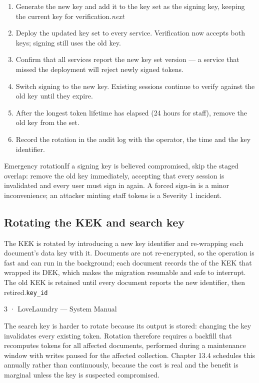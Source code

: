 \documentclass[11pt,a4paper,oneside]{book}
\begin{document}
\begin{enumerate}
\item Generate the new key and add it to the key set as the  signing key, keeping the current key for verification.\emph{next}
\item Deploy the updated key set to every service. Verification now accepts both keys; signing still uses the old key.
\item Confirm that all services report the new key set version — a service that missed the deployment will reject newly signed tokens.
\item Switch signing to the new key. Existing sessions continue to verify against the old key until they expire.
\item After the longest token lifetime has elapsed (24 hours for staff), remove the old key from the set.
\item Record the rotation in the audit log with the operator, the time and the key identifier.
\end{enumerate}
\begin{notebox}Emergency rotationIf a signing key is believed compromised, skip the staged overlap: remove the old key immediately, accepting that every session is invalidated and every user must sign in again. A forced sign-in is a minor inconvenience; an attacker minting staff tokens is a Severity 1 incident.\end{notebox}
\subsection*{Rotating the KEK and search key}
The KEK is rotated by introducing a new key identifier and re-wrapping each document's data key with it. Documents are not re-encrypted, so the operation is fast and can run in the background; each document records the  of the KEK that wrapped its DEK, which makes the migration resumable and safe to interrupt. The old KEK is retained until every document reports the new identifier, then retired.\texttt{key\_id}

3 · LoveLaundry — System Manual

The search key is harder to rotate because its output is stored: changing the key invalidates every existing token. Rotation therefore requires a backfill that recomputes tokens for all affected documents, performed during a maintenance window with writes paused for the affected collection. Chapter 13.4 schedules this annually rather than continuously, because the cost is real and the benefit is marginal unless the key is suspected compromised.
\end{document}
